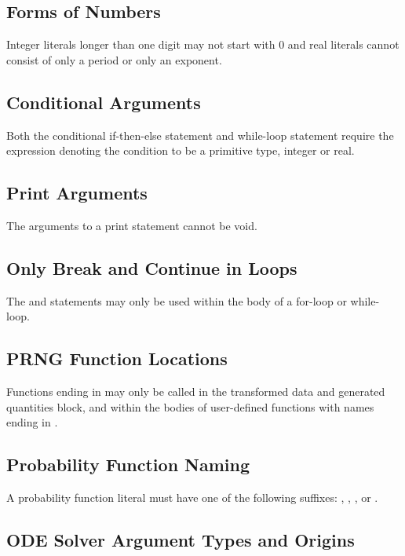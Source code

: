 \subsection{Forms of Numbers}

Integer literals longer than one digit may not start with 0 and real
literals cannot consist of only a period or only an exponent.

\subsection{Conditional Arguments}

Both the conditional if-then-else statement and while-loop statement
require the expression denoting the condition to be a primitive type,
integer or real.

\subsection{Print Arguments}

The arguments to a print statement cannot be void.

\subsection{Only Break and Continue in Loops}

The  and  statements may only be used
within the body of a for-loop or while-loop.

\subsection{PRNG Function Locations}

Functions ending in  may only be called in the transformed
data and generated quantities block, and within the bodies of
user-defined functions with names ending in .

\subsection{Probability Function Naming}

A probability function literal must have one of the following
suffixes: , , , or .

\subsection{ODE Solver Argument Types and Origins}

